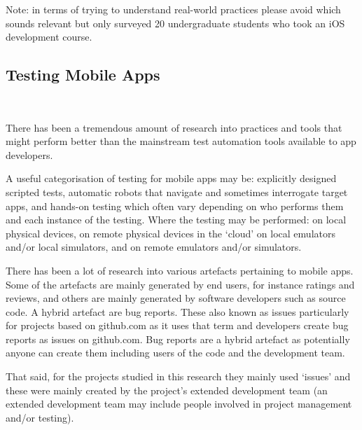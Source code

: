 Note: in terms of trying to understand real-world practices please avoid \textcite{santos2016_investigating_the_adoption_of_agile_practices_by_20_undergrad_students_in_mobile_app_devt} which sounds relevant but only surveyed 20 undergraduate students who took an iOS development course. 

\subsection{Testing Mobile Apps}~\label{rw-testing-mobile-apps-topic}

There has been a tremendous amount of research into practices and tools that might perform better than the mainstream test automation tools available to app developers.

A useful categorisation of testing for mobile apps may be: 
explicitly designed scripted tests, 
automatic robots that navigate and sometimes interrogate target apps, and 
hands-on testing which often vary depending on who performs them and each instance of the testing. 
Where the testing may be performed:
on local physical devices,
on remote physical devices in the `cloud'
on local emulators and/or local simulators, and
on remote emulators and/or simulators.


There has been a lot of research into various artefacts pertaining to mobile apps. Some of the artefacts are mainly generated by end users, for instance ratings and reviews, and others are mainly generated by software developers such as source code. A hybrid artefact are bug reports. These also known as issues particularly for projects based on github.com as it uses that term and developers create bug reports as issues on github.com. Bug reports are a hybrid artefact as potentially anyone can create them including users of the code and the development team. 

That said, for the projects studied in this research they mainly used `issues' and these were mainly created by the project's extended development team (an extended development team may include people involved in project management and/or testing).

